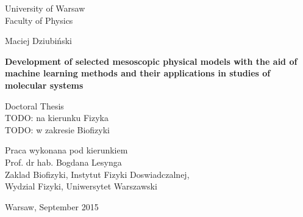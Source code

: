 \vspace{1cm}		%
\pagestyle{empty}	%

\begin{center}
\begin{huge}
	\textsf{University of Warsaw}\\
	\vspace{0.4cm}		%
	\textsf{Faculty of Physics}
\end{huge}

\vspace{2cm}		%

\begin{Large}
	Maciej Dziubi\'nski\\
\end{Large}

\vspace{1.5cm}

\begin{huge}
	\textbf{\textsf{Development of selected mesoscopic physical models with the aid of machine learning methods and their applications in studies of molecular systems}}
\end{huge}

\vspace{3cm}

\begin{large}
	Doctoral Thesis\\
	TODO: na kierunku Fizyka\\
	TODO: w zakresie Biofizyki\\
\end{large}

\end{center}

\vspace{2cm}		%

\begin{flushright}
\begin{large}
	Praca wykonana pod kierunkiem\\
	Prof. dr hab. Bogdana Lesynga\\
	Zaklad Biofizyki, Instytut Fizyki Doswiadczalnej,\\
	Wydzial Fizyki, Uniwersytet Warszawski\\
\end{large}
\end{flushright}

\vspace{2.0cm}

\begin{center}
	Warsaw, September 2015
\end{center}


